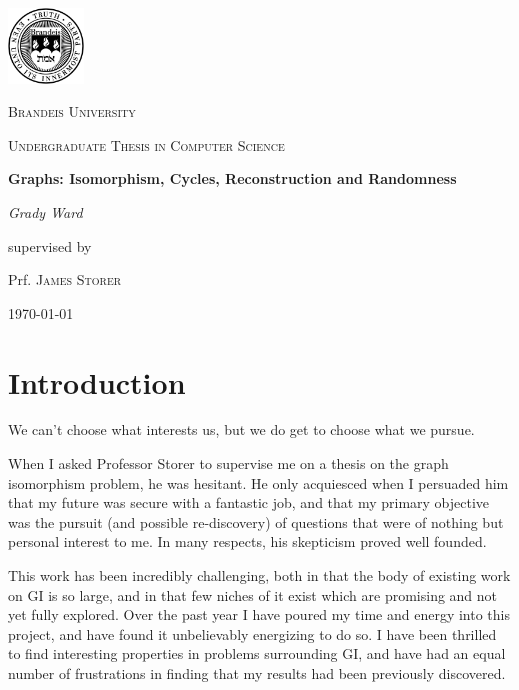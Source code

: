 \documentclass[11pt,a4paper]{report}
\begin{document}
\begin{titlepage}
	\centering
	\includegraphics[width=0.15\textwidth]{brandeis-seal}\par\vspace{1cm}
	{\scshape\LARGE Brandeis University \par}
	\vspace{1cm}
	{\scshape\Large Undergraduate Thesis in Computer Science\par}
	\vspace{1.5cm}
	{\huge\bfseries Graphs: Isomorphism, Cycles, Reconstruction and Randomness\par}
	\vspace{2cm}
	{\Large\itshape Grady Ward\par}
	\vfill
	supervised by\par
	Prf. \textsc{James Storer}
	\vfill

	{\large \today\par}
\end{titlepage}

\tableofcontents

\chapter*{Introduction}
We can't choose what interests us, but we do get to choose what we pursue.

When I asked Professor Storer to supervise me on a thesis on the graph isomorphism problem, he was hesitant.
He only acquiesced when I persuaded him that my future was secure with a fantastic job, and that my primary objective was the pursuit (and possible re-discovery) of questions that were of nothing but personal interest to me.
In many respects, his skepticism proved well founded.

This work has been incredibly challenging, both in that the body of existing work on GI is so large, and in that few niches of it exist which are promising and not yet fully explored.
Over the past year I have poured my time and energy into this project, and have found it unbelievably energizing to do so.
I have been thrilled to find interesting properties in problems surrounding GI, and have had an equal number of frustrations in finding that my results had been previously discovered.
\end{document}
